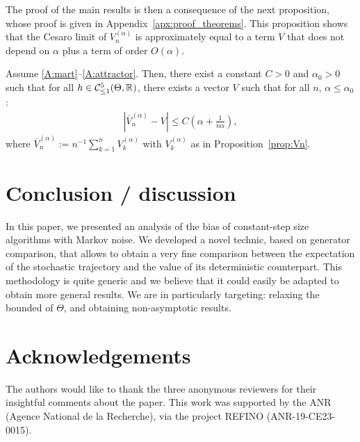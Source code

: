 \documentclass{article}
\newcommand{\R}{\mathbb{R}}
\newcommand\abs[1]{\left|#1\right|}
\newcommand\toA{^{(\alpha)}}
\newcommand\cont[3][]{\mathcal{C}^{#2}_{\ifthenelse{\equal{#1}{all}}{}{\le1}}(#3,\R)}
\begin{document}
The proof of the main results is then a consequence of the next proposition, whose proof is given in Appendix~\ref{apx:proof_theorems}. This proposition shows that the Cesaro limit of $V\toA_n$ is approximately equal to a term $V$ that does not depend on $\alpha$ plus a term of order $O(\alpha)$. 

\begin{proposition}
    \label{prop:V}
    Assume \ref{A:mart}--\ref{A:attractor}. Then, there exist a constant $C>0$ and $\alpha_0>0$ such that for all $h\in\cont{5}{\Theta}$, there exists a vector $V$ such that for all $n$, $\alpha\le\alpha_0$:
    \begin{align*}
        \abs{\overline{V}\toA_n - V} \le C(\alpha + \frac1{n\alpha}),
    \end{align*}
    where $\overline{V}\toA_n := n^{-1}\sum_{k=1}^{n}V\toA_k$ with $V\toA_k$ as in Proposition~\ref{prop:Vn}.
\end{proposition}

\section{Conclusion / discussion}

In this paper, we presented an analysis of the bias of constant-step size algorithms with Markov noise. We developed a novel technic, based on generator comparison, that allows to obtain a very fine comparison between the expectation of the stochastic trajectory and the value of its  deterministic counterpart.  This methodology is quite generic and we believe that it could easily be adapted to obtain more general results. We are in particularly targeting: relaxing the bounded of $\Theta$, and obtaining non-asymptotic results.



\section{Acknowledgements}

The authors would like to thank the three anonymous reviewers for their insightful comments about the paper. This work was supported by the ANR (Agence National de la Recherche), via the project REFINO (ANR-19-CE23-0015).








\newpage 

\appendix
\end{document}
